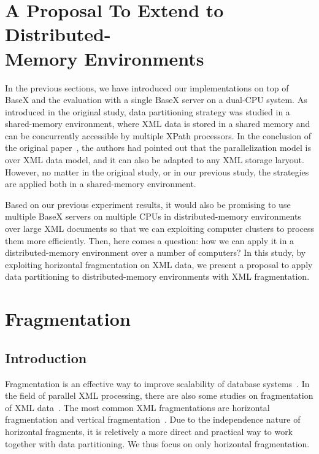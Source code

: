 \section{A Proposal To Extend to Distributed-\\Memory Environments}

In the previous sections, we have introduced our implementations on top of BaseX
and the evaluation with a single BaseX server on a dual-CPU system. As
introduced in the original study, data partitioning strategy was studied in a
shared-memory environment, where XML data is stored in a shared memory and can
be concurrently accessible by multiple XPath processors. In the conclusion of
the original paper~\cite{BoLS09},  the authors had pointed out that the
parallelization model is over XML data model, and it can also be adapted to any
XML storage laryout. However,  no matter in the original study, or in our
previous study, the strategies  are applied both in a shared-memory environment. 

Based on our previous experiment results, it would also be promising to use
multiple BaseX servers on multiple CPUs in distributed-memory environments over
large XML documents so that we can exploiting computer clusters to process  them
more efficiently. Then, here comes a question: how we can apply it in a
distributed-memory environment over a number of computers?  In this study, by
exploiting horizontal fragmentation on XML data, we present a  proposal to apply
data partitioning to distributed-memory environments with XML  fragmentation.

\section{Fragmentation}
\subsection{Introduction}

Fragmentation is an effective way to improve scalability of database
systems~\cite{navathe1995mixed, hauglid2010dyfram, khan2010new}.  In the field
of parallel XML processing, there are also some studies on  fragmentation of XML
data~\cite{kling11:dist_xml, KlOD10}.  The most common XML fragmentations are
horizontal fragmentation and vertical fragmentation~\cite{kling11:dist_xml}. Due
to the independence nature of horizontal fragments, it is reletively a more
direct and practical way to work together with data partitioning. We thus focus
on only horizontal fragmentation.

